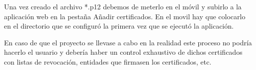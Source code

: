 Una vez creado el archivo *.p12 debemos de meterlo en el móvil y subirlo a la aplicación web en la pestaña Añadir certificados. En el movil hay que colocarlo en el directorio que se configuró la primera vez que se ejecutó la aplicación.

En caso de que el proyecto se llevase a cabo en la realidad este proceso no podría hacerlo el usuario y debería haber un control exhaustivo de dichos certificados con listas de revocación, entidades que firmasen los certificados, etc.








